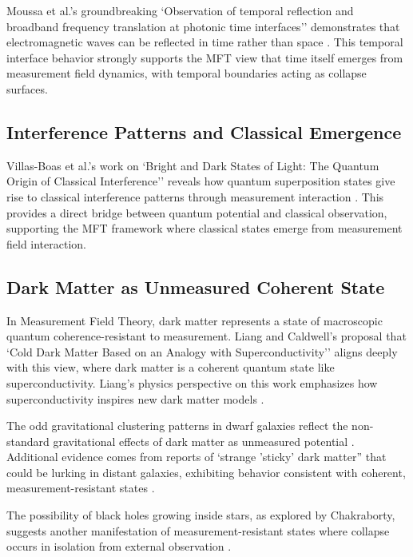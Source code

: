 Moussa et al.'s groundbreaking `Observation of temporal reflection and broadband frequency translation at photonic time interfaces'' demonstrates that electromagnetic waves can be reflected in time rather than space \cite{moussa_observation_2023}. This temporal interface behavior strongly supports the MFT view that time itself emerges from measurement field dynamics, with temporal boundaries acting as collapse surfaces.

\subsection{Interference Patterns and Classical Emergence}

Villas-Boas et al.'s work on `Bright and Dark States of Light: The Quantum Origin of Classical Interference'' reveals how quantum superposition states give rise to classical interference patterns through measurement interaction \cite{villas-boas_bright_2025}. This provides a direct bridge between quantum potential and classical observation, supporting the MFT framework where classical states emerge from measurement field interaction.

\subsection{Dark Matter as Unmeasured Coherent State}

In Measurement Field Theory, dark matter represents a state of macroscopic quantum coherence-resistant to measurement. Liang and Caldwell's proposal that `Cold Dark Matter Based on an Analogy with Superconductivity'' aligns deeply with this view, where dark matter is a coherent quantum state like superconductivity. Liang's physics perspective on this work emphasizes how superconductivity inspires new dark matter models \cite{liang_cold_2025, zurek_decoherence_2003}.

The odd gravitational clustering patterns in dwarf galaxies reflect the non-standard gravitational effects of dark matter as unmeasured potential \cite{zhang2025}. Additional evidence comes from reports of `strange 'sticky' dark matter'' that could be lurking in distant galaxies, exhibiting behavior consistent with coherent, measurement-resistant states \cite{enzi_overconcentrated_2025}.

The possibility of black holes growing inside stars, as explored by Chakraborty, suggests another manifestation of measurement-resistant states where collapse occurs in isolation from external observation \cite{adarsha_accretion_2025}.




